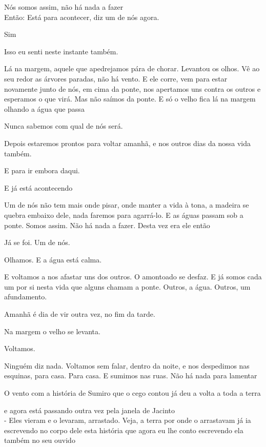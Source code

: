 Nós somos assim, não há nada a fazer\\

Então: Está para acontecer, diz um de nós agora.

Sim

Isso eu senti neste instante também.

Lá na margem, aquele que apedrejamos pára de chorar. Levantou os olhos.
Vê ao seu redor as árvores paradas, não há vento. E ele corre, vem para
estar novamente junto de nós, em cima da ponte, nos apertamos uns contra
os outros e esperamos o que virá. Mas não saímos da ponte. E só o velho
fica lá na margem olhando a água que passa

Nunca sabemos com qual de nós será.

Depois estaremos prontos para voltar amanhã, e nos outros dias da nossa
vida também.

E para ir embora daqui.

E já está acontecendo

Um de nós não tem mais onde pisar, onde manter a vida à tona, a madeira
se quebra embaixo dele, nada faremos para agarrá-lo. E as águas passam
sob a ponte. Somos assim. Não há nada a fazer. Desta vez era ele então

Já se foi. Um de nós.

Olhamos. E a água está calma.

E voltamos a nos afastar uns dos outros. O amontoado se desfaz. E já
somos cada um por si nesta vida que alguns chamam a ponte. Outros, a
água. Outros, um afundamento.

Amanhã é dia de vir outra vez, no fim da tarde.

Na margem o velho se levanta.

Voltamos.

Ninguém diz nada. Voltamos sem falar, dentro da noite, e nos despedimos
nas esquinas, para casa. Para casa. E sumimos nas ruas. Não há nada para
lamentar

\pagebreak

\clearpage
\thispagestyle{empty}

\movetooddpage

O vento com a história de Sumiro que o cego contou já deu a volta a toda
a terra

e agora está passando outra vez pela janela de Jacinto\\

- Eles vieram e o levaram, arrastado. Veja, a terra por onde o
arrastavam já ia escrevendo no corpo dele esta história que agora eu lhe
conto escrevendo ela também no seu ouvido

